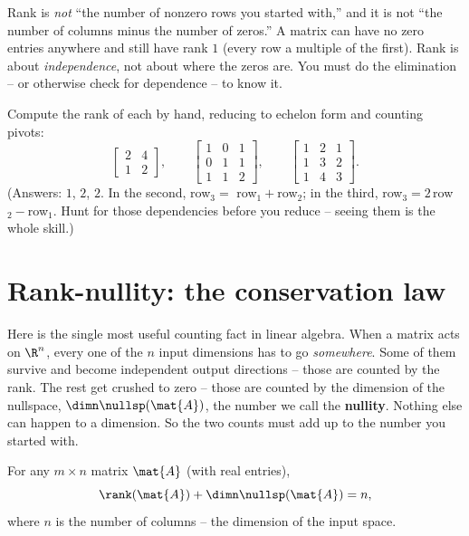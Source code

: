 \begin{trapbox}
Rank is \emph{not} ``the number of nonzero rows you started with,'' and it is not
``the number of columns minus the number of zeros.'' A matrix can have no zero
entries anywhere and still have rank $1$ (every row a multiple of the first).
Rank is about \emph{independence}, not about where the zeros are. You must do the
elimination -- or otherwise check for dependence -- to know it.
\end{trapbox}

\begin{labbox}
Compute the rank of each by hand, reducing to echelon form and counting pivots:
\[
  \begin{bmatrix} 2 & 4 \\ 1 & 2 \end{bmatrix}, \qquad
  \begin{bmatrix} 1 & 0 & 1 \\ 0 & 1 & 1 \\ 1 & 1 & 2 \end{bmatrix}, \qquad
  \begin{bmatrix} 1 & 2 & 1 \\ 1 & 3 & 2 \\ 1 & 4 & 3 \end{bmatrix}.
\]
(Answers: $1$, $2$, $2$. In the second, row$_3 = $ row$_1+$row$_2$; in the third,
row$_3 = 2\,$row$_2 - $row$_1$. Hunt for those dependencies before you reduce --
seeing them is the whole skill.)
\end{labbox}

\section{Rank-nullity: the conservation law}

Here is the single most useful counting fact in linear algebra. When a matrix
acts on $\R^n$, every one of the $n$ input dimensions has to go \emph{somewhere}.
Some of them survive and become independent output directions -- those are
counted by the rank. The rest get crushed to zero -- those are counted by the
dimension of the nullspace, $\dimn\nullsp(\mat{A})$, the number we call the
\textbf{nullity}. Nothing else can happen to a dimension. So the two counts must
add up to the number you started with.

\begin{theorem}\label{ch16:rank-nullity}
For any $m \times n$ matrix $\mat{A}$ (with real entries),
\[
  \rank(\mat{A}) + \dimn\nullsp(\mat{A}) = n,
\]
where $n$ is the number of columns -- the dimension of the input space.
\end{theorem}

